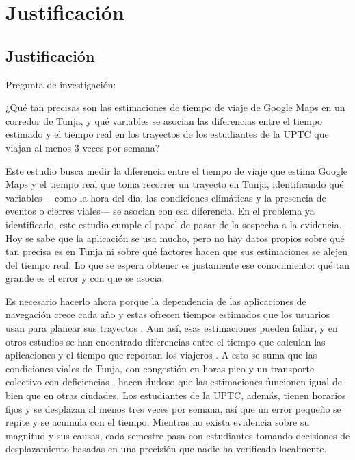 \section{Justificación}

\subsection{Justificación}
Pregunta de investigación:

¿Qué tan precisas son las estimaciones de tiempo de viaje de Google Maps en un corredor de Tunja, y qué variables se asocian las diferencias entre el tiempo estimado y el tiempo real en los trayectos de los estudiantes de la UPTC que viajan al menos 3 veces por semana?

Este estudio busca medir la diferencia entre el tiempo de viaje que estima Google Maps y el tiempo real que toma recorrer un trayecto en Tunja, identificando qué variables —como la hora del día, las condiciones climáticas y la presencia de eventos o cierres viales— se asocian con esa diferencia. En el problema ya identificado, este estudio cumple el papel de pasar de la sospecha a la evidencia. Hoy se sabe que la aplicación se usa mucho, pero no hay datos propios sobre qué tan precisa es en Tunja ni sobre qué factores hacen que sus estimaciones se alejen del tiempo real. Lo que se espera obtener es justamente ese conocimiento: qué tan grande es el error y con que se asocia.

Es necesario hacerlo ahora porque la dependencia de las aplicaciones de navegación crece cada año \cite{dahmani2020,elpais2026} y estas ofrecen tiempos estimados que los usuarios usan para planear sus trayectos \cite{bastarianto2025}. Aun así, esas estimaciones pueden fallar, y en otros estudios se han encontrado diferencias entre el tiempo que calculan las aplicaciones y el tiempo que reportan los viajeros \cite{bastarianto2025,arxiv2017}. A esto se suma que las condiciones viales de Tunja, con congestión en horas pico \cite{uptc2022} y un transporte colectivo con deficiencias \cite{sanchez2012}, hacen dudoso que las estimaciones funcionen igual de bien que en otras ciudades. Los estudiantes de la UPTC, además, tienen horarios fijos y se desplazan al menos tres veces por semana, así que un error pequeño se repite y se acumula con el tiempo. Mientras no exista evidencia sobre su magnitud y sus causas, cada semestre pasa con estudiantes tomando decisiones de desplazamiento basadas en una precisión que nadie ha verificado localmente.

